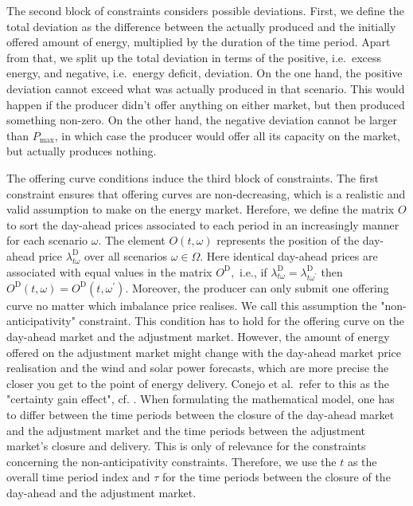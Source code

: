 The second block of constraints considers possible deviations. First, we define the total deviation as the difference between the actually produced and the initially offered amount of energy, multiplied by the duration of the time period. Apart from that, we split up the total deviation in terms of the positive, i.e.\ excess energy, and negative, i.e.\ energy deficit, deviation. On the one hand, the positive deviation cannot exceed what was actually produced in that scenario. This would happen if the producer didn't offer anything on either market, but then produced something non-zero. On the other hand, the negative deviation cannot be larger than $P_{\max}$, in which case the producer would offer all its capacity on the market, but actually produces nothing. 

The offering curve conditions induce the third block of constraints. The first constraint ensures that offering curves are non-decreasing, which is a realistic and valid assumption to make on the energy market. Herefore, we define the matrix $O$ to sort the day-ahead prices associated to each period in an increasingly manner for each scenario $\omega .$ The element $O(t, \omega)$ represents the position of the day-ahead price $\lambda_{t \omega}^{\mathrm{D}}$ over all scenarios $\omega \in \Omega$. Here identical day-ahead prices are associated with equal values in the matrix $O^{\mathrm{D}},$ i.e., if $\lambda_{t \omega}^{\mathrm{D}}=\lambda_{t \omega^{\prime}}^{\mathrm{D}}$ then $O^{\mathrm{D}}(t, \omega)=O^{\mathrm{D}}\left(t, \omega^{\prime}\right).$ Moreover, the producer can only submit one offering curve no matter which imbalance price realises. We call this assumption the "non-anticipativity" constraint. This condition has to hold for the offering curve on the day-ahead market and the adjustment market. However, the amount of energy offered on the adjustment market might change with the day-ahead market price realisation and the wind and solar power forecasts, which are more precise the closer you get to the point of energy delivery. Conejo et al.\ refer to this as the "certainty gain effect", cf. \cite{Conejo10}. When formulating the mathematical model, one has to differ between the
time periods between the closure of the day-ahead market and the adjustment market and
the time periods between the adjustment market's closure and delivery.  This is only of relevance for the constraints concerning the non-anticipativity constraints. Therefore, we use the $t$ as the overall time period index and $\tau$ for the time periods between the closure of the day-ahead and the adjustment market.

